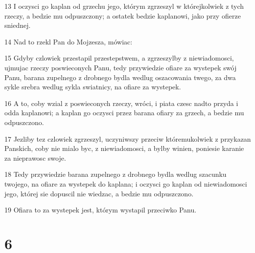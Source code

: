 \par 13 I oczysci go kaplan od grzechu jego, którym zgrzeszyl w którejkolwiek z tych rzeczy, a bedzie mu odpuszczony; a ostatek bedzie kaplanowi, jako przy ofierze sniednej.
\par 14 Nad to rzekl Pan do Mojzesza, mówiac:
\par 15 Gdyby czlowiek przestapil przestepstwem, a zgrzeszylby z niewiadomosci, ujmujac rzeczy poswieconych Panu, tedy przywiedzie ofiare za wystepek swój Panu, barana zupelnego z drobnego bydla wedlug oszacowania twego, za dwa sykle srebra wedlug sykla swiatnicy, na ofiare za wystepek.
\par 16 A to, coby wzial z poswieconych rzeczy, wróci, i piata czesc nadto przyda i odda kaplanowi; a kaplan go oczysci przez barana ofiary za grzech, a bedzie mu odpuszczono.
\par 17 Jezliby tez czlowiek zgrzeszyl, uczyniwszy przeciw któremukolwiek z przykazan Panskich, coby nie mialo byc, z niewiadomosci, a bylby winien, poniesie karanie za nieprawosc swoje.
\par 18 Tedy przywiedzie barana zupelnego z drobnego bydla wedlug szacunku twojego, na ofiare za wystepek do kaplana; i oczysci go kaplan od niewiadomosci jego, której sie dopuscil nie wiedzac, a bedzie mu odpuszczono.
\par 19 Ofiara to za wystepek jest, którym wystapil przeciwko Panu.

\chapter{6}

